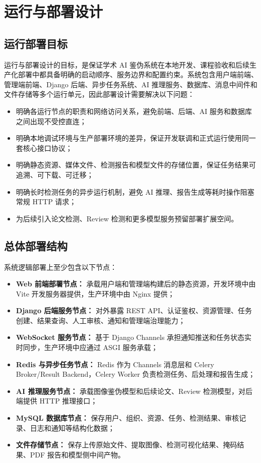 \section{运行与部署设计}

\subsection{运行部署目标}
运行与部署设计的目标，是保证学术 AI 鉴伪系统在本地开发、课程验收和后续生产化部署中都具备明确的启动顺序、服务边界和配置约束。系统包含用户端前端、管理端前端、Django 后端、异步任务系统、AI 推理服务、数据库、消息中间件和文件存储等多个运行单元，因此部署设计需要解决以下问题：
\begin{itemize}[leftmargin=2em]
    \item 明确各运行节点的职责和网络访问关系，避免前端、后端、AI 服务和数据库之间出现不受控直连；
    \item 明确本地调试环境与生产部署环境的差异，保证开发联调和正式运行使用同一套核心接口协议；
    \item 明确静态资源、媒体文件、检测报告和模型文件的存储位置，保证任务结果可追溯、可下载、可迁移；
    \item 明确长时检测任务的异步运行机制，避免 AI 推理、报告生成等耗时操作阻塞常规 HTTP 请求；
    \item 为后续引入论文检测、Review 检测和更多模型服务预留部署扩展空间。
\end{itemize}

\subsection{总体部署结构}
系统逻辑部署上至少包含以下节点：
\begin{itemize}[leftmargin=2em]
    \item \textbf{Web 前端部署节点：} 承载用户端和管理端构建后的静态资源，开发环境中由 Vite 开发服务器提供，生产环境中由 Nginx 提供；
    \item \textbf{Django 后端服务节点：} 对外暴露 REST API、认证鉴权、资源管理、任务创建、结果查询、人工审核、通知和管理端治理能力；
    \item \textbf{WebSocket 服务节点：} 基于 Django Channels 承担通知推送和任务状态实时同步，生产环境中应通过 ASGI 服务承载；
    \item \textbf{Redis 与异步任务节点：} Redis 作为 Channels 消息层和 Celery Broker/Result Backend，Celery Worker 负责检测任务、后处理和报告生成；
    \item \textbf{AI 推理服务节点：} 承载图像鉴伪模型和后续论文、Review 检测模型，对后端提供 HTTP 推理接口；
    \item \textbf{MySQL 数据库节点：} 保存用户、组织、资源、任务、检测结果、审核记录、日志和通知等结构化数据；
    \item \textbf{文件存储节点：} 保存上传原始文件、提取图像、检测可视化结果、掩码结果、PDF 报告和模型侧中间产物。
\end{itemize}

